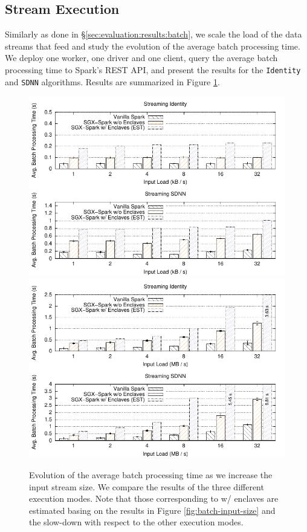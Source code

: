 \subsection{Stream Execution} \label{sec:evaluation:results:stream}

Similarly as done in \S\ref{sec:evaluation:results:batch}, we scale the load of the data streams that feed \projName and study the evolution of the average batch processing time.
We deploy one worker, one driver and one client, query the average batch processing time to Spark's REST API, and present the results for the \texttt{Identity} and \texttt{SDNN} algorithms. 
Results are summarized in Figure \ref{fig:throughput}.

\begin{figure}[h!]
    \centering
    \includegraphics[width=.85\textwidth]{plots/stream/input_size/throughput.pdf}
    \includegraphics[width=.85\textwidth]{plots/stream/input_size/big_throughput.pdf}
    \caption[Evolution of the average batch processing time as we increase the input stream size.]{Evolution of the average batch processing time as we increase the input stream size. We compare the results of the three different execution modes. Note that those corresponding to \sgxspark w/ enclaves are estimated basing on the results in Figure \ref{fig:batch-input-size} and the slow-down with respect to the other execution modes. \label{fig:throughput}}
\end{figure}

